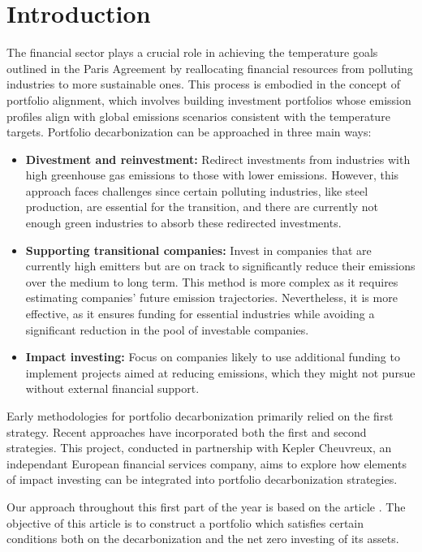 \section{Introduction}
The financial sector plays a crucial role in achieving the temperature goals outlined in the Paris Agreement by reallocating financial resources from polluting industries to more sustainable ones. This process is embodied in the concept of portfolio alignment, which involves building investment portfolios whose emission profiles align with global emissions scenarios consistent with the temperature targets. Portfolio decarbonization can be approached in three main ways:

\begin{itemize}
    \item \textbf{Divestment and reinvestment:} Redirect investments from industries with high greenhouse gas emissions to those with lower emissions. However, this approach faces challenges since certain polluting industries, like steel production, are essential for the transition, and there are currently not enough green industries to absorb these redirected investments.\\
    \item \textbf{Supporting transitional companies:} Invest in companies that are currently high emitters but are on track to significantly reduce their emissions over the medium to long term. This method is more complex as it requires estimating companies' future emission trajectories. Nevertheless, it is more effective, as it ensures funding for essential industries while avoiding a significant reduction in the pool of investable companies.\\
    \item \textbf{Impact investing:} Focus on companies likely to use additional funding to implement projects aimed at reducing emissions, which they might not pursue without external financial support.\\
\end{itemize}


Early methodologies for portfolio decarbonization primarily relied on the first strategy. Recent approaches have incorporated both the first and second strategies. This project, conducted in partnership with Kepler Cheuvreux, an independant European financial services company, aims to explore how elements of impact investing can be integrated into portfolio decarbonization strategies.


Our approach throughout this first part of the year is based on the article \citep{barahhou2022netzero}. The objective of this article is to construct a portfolio which satisfies certain conditions both on the decarbonization and the net zero investing of its assets. 
